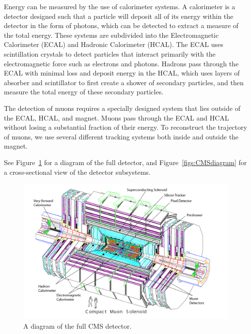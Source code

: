 Energy can be measured by the use of calorimeter systems.  
A calorimeter is a detector designed such that a particle will deposit all of its energy within the detector in the form of photons, 
which can be detected to extract a measure of the total energy. 
These systems are subdivided into the Electromagnetic Calorimeter (ECAL) and Hadronic Calorimeter (HCAL).  
The ECAL uses scintillation crystals to detect particles that interact primarily with the electromagnetic force such as electrons and photons.  
Hadrons pass through the ECAL with minimal loss and deposit energy in the HCAL, which uses layers of absorber and scintillator to first 
create a shower of secondary particles, and then measure the total energy of these secondary particles.  

The detection of muons requires a specially designed system that lies outside of the ECAL, HCAL, and magnet.  
Muons pass through the ECAL and HCAL without losing a substantial fraction of their energy.  
To reconstruct the trajectory of muons, we use several different tracking systems both inside and outside the magnet.

See Figure~\ref{figs:CMSdiagram1} for a diagram of the full detector, and Figure~\ref{figs:CMSdiagram} for a cross-sectional view of the detector subsystems.

\begin{figure}
\begin{center}
\includegraphics[width=1.0\linewidth]{figs/CMSdiagram1.png}
\caption{A diagram of the full CMS detector.}
\label{figs:CMSdiagram1}
\end{center}
\end{figure}

